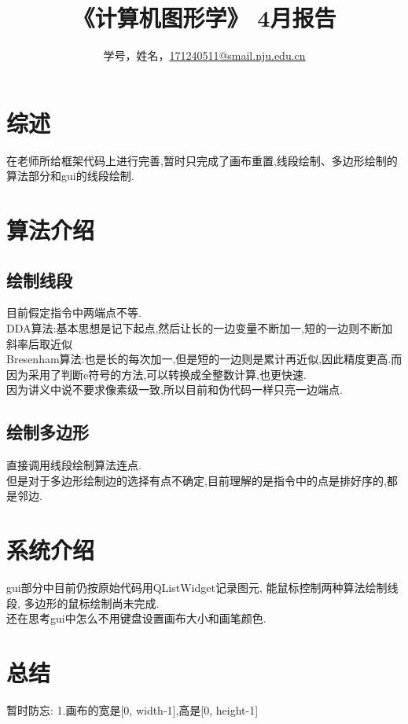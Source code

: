 \documentclass[a4paper,UTF8]{article}
\theoremstyle{definition}
\begin{document}
\title{\textbf{《计算机图形学》 4月报告 }}
\author{学号，姓名，\href{mailto:xxx@xxx.com}{171240511@smail.nju.edu.cn}}
\maketitle

\section{综述}
在老师所给框架代码上进行完善,暂时只完成了画布重置,线段绘制、多边形绘制的算法部分和gui的线段绘制.

\section{算法介绍}
\subsection{绘制线段}
目前假定指令中两端点不等.\\
\indent DDA算法:基本思想是记下起点,然后让长的一边变量不断加一,短的一边则不断加斜率后取近似\cite{rog_2002}\\
\indent Bresenham算法:也是长的每次加一,但是短的一边则是累计再近似,因此精度更高.而因为采用了判断e符号的方法,可以转换成全整数计算,也更快速.\cite{rog_2002}\\
\indent 因为讲义中说不要求像素级一致,所以目前和伪代码一样只亮一边端点.
\subsection{绘制多边形}
直接调用线段绘制算法连点.\\
\indent 但是对于多边形绘制边的选择有点不确定,目前理解的是指令中的点是排好序的,都是邻边.
		
\section{系统介绍}
gui部分中目前仍按原始代码用QListWidget记录图元, 能鼠标控制两种算法绘制线段,
多边形的鼠标绘制尚未完成.\\
\indent 还在思考gui中怎么不用键盘设置画布大小和画笔颜色.

\section{总结}
暂时防忘:
\indent 1.画布的宽是[0, width-1],高是[0, height-1]

%

\end{document}
